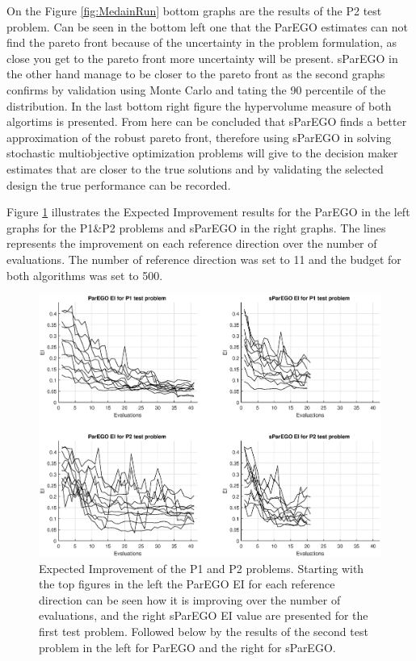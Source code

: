 \documentclass[10pt]{llncs}
\begin{document}
On the Figure \ref{fig:MedainRun} bottom graphs are the results of the P2 test problem. Can be seen in the bottom left one that the ParEGO estimates can not find the pareto front because of the uncertainty in the problem formulation, as close you get to the pareto front more uncertainty will be present. sParEGO in the other hand manage to be closer to the pareto front as the second graphs confirms by validation using Monte Carlo and tating the 90 percentile of the distribution. In the last bottom right figure the hypervolume measure of both algortims is presented. From here can be concluded that sParEGO finds a better approximation of the robust pareto front, therefore using sParEGO in solving stochastic multiobjective optimization problems will give to the decision maker estimates that are closer to the true solutions and by validating the selected design the true performance can be recorded.
    
Figure \ref{fig:EI} illustrates the Expected Improvement results for the ParEGO in the left graphs for the P1$\&$P2  problems  and sParEGO in the right graphs. The lines represents the improvement on each reference direction over the number of evaluations. The number of reference direction was set to 11 and the budget for both algorithms was set to 500. 

\begin{figure}
\begin{center}
\includegraphics[scale=0.45, center]{EI}
\end{center}
\caption{Expected Improvement of the P1 and P2 problems. Starting with the top figures in the left the ParEGO EI for each reference direction can be seen how it is improving over the number of evaluations, and the right sParEGO EI value are presented for the first test problem. Followed below by the results of the second test problem in the left for ParEGO and the right for sParEGO.}
\label{fig:EI}
\end{figure}
\end{document}
